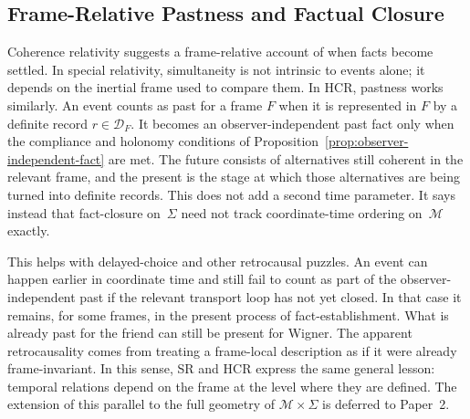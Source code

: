 \documentclass[aps,prd,twocolumn,superscriptaddress,nofootinbib,floatfix]{revtex4-2}
\newcommand{\Sig}{\Sigma}
\newcommand{\HCR}{HCR}
\newcommand{\CR}{\HCR}  %
\begin{document}
\subsection{Frame-Relative Pastness and Factual Closure}

Coherence relativity suggests a frame-relative account of when facts become settled. In special relativity, simultaneity is not intrinsic to events alone; it depends on the inertial frame used to compare them. In \CR{}, pastness works similarly. An event counts as past for a frame $F$ when it is represented in $F$ by a definite record $r \in \mathcal{D}_F$. It becomes an observer-independent past fact only when the compliance and holonomy conditions of Proposition~\ref{prop:observer-independent-fact} are met. The future consists of alternatives still coherent in the relevant frame, and the present is the stage at which those alternatives are being turned into definite records. This does not add a second time parameter. It says instead that fact-closure on~$\Sig$ need not track coordinate-time ordering on~$\mathcal{M}$ exactly.

This helps with delayed-choice and other retrocausal puzzles. An event can happen earlier in coordinate time and still fail to count as part of the observer-independent past if the relevant transport loop has not yet closed. In that case it remains, for some frames, in the present process of fact-establishment. What is already past for the friend can still be present for Wigner. The apparent retrocausality comes from treating a frame-local description as if it were already frame-invariant. In this sense, SR and \CR{} express the same general lesson: temporal relations depend on the frame at the level where they are defined. The extension of this parallel to the full geometry of $\mathcal{M}\times\Sig$ is deferred to Paper~2.
\end{document}
